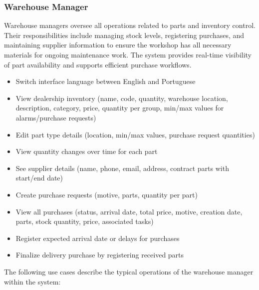 \subsubsection{Warehouse Manager}

Warehouse managers oversee all operations related to parts and inventory control. Their responsibilities include managing stock levels, registering purchases, and maintaining supplier information to ensure the workshop has all necessary materials for ongoing maintenance work. The system provides real-time visibility of part availability and supports efficient purchase workflows.


\begin{itemize}
    \item Switch interface language between English and Portuguese
    \item View dealership inventory (name, code, quantity, warehouse location, description, category, price, quantity per group, min/max values for alarms/purchase requests)
    \item Edit part type details (location, min/max values, purchase request quantities)
    \item View quantity changes over time for each part
    \item See supplier details (name, phone, email, address, contract parts with start/end date)
    \item Create purchase requests (motive, parts, quantity per part)
    \item View all purchases (status, arrival date, total price, motive, creation date, parts, stock quantity, price, associated tasks)
    \item Register expected arrival date or delays for purchases
    \item Finalize delivery purchase by registering received parts
\end{itemize}

The following use cases describe the typical operations of the warehouse manager within the system:


